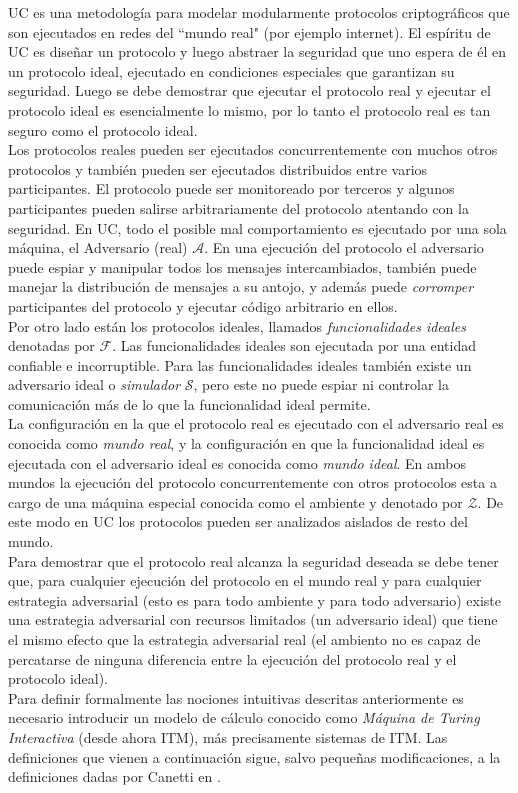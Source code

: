 UC es una metodología para modelar modularmente protocolos criptográficos que son ejecutados en redes
del ``mundo real" (por ejemplo internet). El espíritu de UC es diseñar un protocolo y luego abstraer la
seguridad que uno espera de él en un protocolo ideal, ejecutado en condiciones especiales que garantizan
su seguridad. Luego se debe demostrar que ejecutar el protocolo real y ejecutar el protocolo ideal es
esencialmente lo mismo, por lo tanto el protocolo real es tan seguro como el protocolo ideal.\\
Los protocolos reales pueden ser ejecutados concurrentemente con muchos otros protocolos
y también pueden ser ejecutados distribuidos entre varios participantes.
El protocolo puede ser monitoreado por terceros y algunos participantes pueden salirse
arbitrariamente del protocolo atentando con la seguridad. En UC, todo el posible mal comportamiento es
ejecutado por una sola
máquina, el Adversario (real) $\mathcal{A}$. En una ejecución del protocolo el adversario puede espiar y
manipular todos los mensajes intercambiados, también puede manejar la distribución de mensajes a su antojo,
y además puede \textit{corromper} participantes del protocolo y ejecutar código arbitrario en ellos.\\
Por otro lado están los protocolos ideales, llamados \textit{funcionalidades ideales} denotadas por 
$\mathcal{F}$. Las funcionalidades ideales son ejecutada por una entidad confiable
e incorruptible. Para las funcionalidades ideales también existe un adversario ideal o \textit{simulador}
$\mathcal{S}$, pero este no puede espiar ni controlar la comunicación más de lo que la funcionalidad ideal
permite.\\
La configuración en la que el protocolo real es ejecutado con el adversario real es conocida como \textit{mundo
real}, y la configuración en que la funcionalidad ideal es ejecutada con el adversario ideal es conocida como
\textit{mundo ideal}. En ambos mundos la ejecución del protocolo concurrentemente con otros protocolos esta a cargo
de una máquina especial conocida como el ambiente y denotado por $\mathcal{Z}$. De este modo en UC los protocolos
pueden ser analizados aislados de resto del mundo.\\
Para demostrar que el protocolo real alcanza la seguridad deseada
se debe tener que, para cualquier ejecución del protocolo en el mundo real y para cualquier estrategia adversarial
(esto es para todo ambiente y para todo adversario) existe una estrategia adversarial con recursos limitados (un
adversario ideal) que tiene el mismo efecto que la estrategia adversarial real (el ambiento no es capaz de percatarse
de ninguna diferencia entre la ejecución del protocolo real y el protocolo ideal).\\
Para definir formalmente las nociones intuitivas descritas anteriormente es necesario introducir un modelo de
cálculo conocido como \textit{Máquina de Turing Interactiva} (desde ahora ITM), más precisamente sistemas de ITM.
Las definiciones que vienen a continuación sigue, salvo pequeñas modificaciones, a la definiciones dadas por Canetti
en \cite{cryptoeprint:2006:465}.

